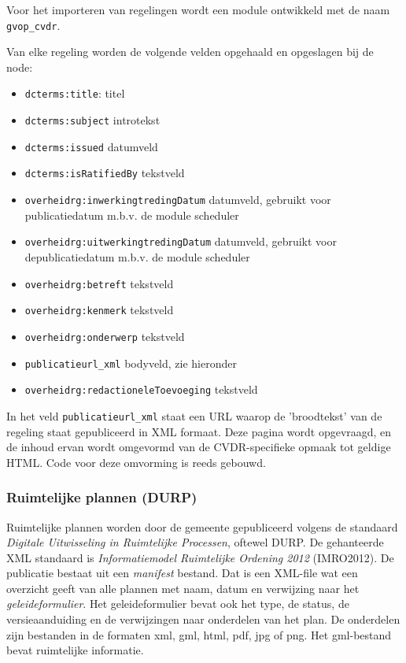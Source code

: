 Voor het importeren van regelingen wordt een module ontwikkeld met de naam \texttt{gvop\_cvdr}.

Van elke regeling worden de volgende velden opgehaald en opgeslagen bij de node:

\begin{itemize}
\item \texttt{dcterms:title}: titel
\item \texttt{dcterms:subject} introtekst
\item \texttt{dcterms:issued} datumveld
\item \texttt{dcterms:isRatifiedBy} tekstveld
\item \texttt{overheidrg:inwerkingtredingDatum} datumveld, gebruikt voor publicatiedatum m.b.v. de module scheduler
\item \texttt{overheidrg:uitwerkingtredingDatum} datumveld, gebruikt voor depublicatiedatum m.b.v. de module scheduler
\item \texttt{overheidrg:betreft} tekstveld
\item \texttt{overheidrg:kenmerk} tekstveld
\item \texttt{overheidrg:onderwerp} tekstveld
\item \texttt{publicatieurl\_xml} bodyveld, zie hieronder
\item \texttt{overheidrg:redactioneleToevoeging} tekstveld
\end{itemize}

In het veld \texttt{publicatieurl\_xml} staat een URL waarop de 'broodtekst' van de regeling staat gepubliceerd in XML formaat. Deze pagina wordt opgevraagd, en de inhoud ervan wordt omgevormd van de CVDR-specifieke opmaak tot geldige HTML. Code voor deze omvorming is reeds gebouwd.

\subsubsection{Ruimtelijke plannen (DURP)}

Ruimtelijke plannen worden door de gemeente gepubliceerd volgens de standaard \emph{Digitale Uitwisseling in Ruimtelijke Processen}, oftewel DURP. De gehanteerde XML standaard is \emph{Informatiemodel Ruimtelijke Ordening 2012} (IMRO2012). De publicatie bestaat uit een \emph{manifest} bestand. Dat is een XML-file wat een overzicht geeft van alle plannen met naam, datum en verwijzing naar het \emph{geleideformulier}. Het geleideformulier bevat ook het type, de status, de versieaanduiding en de verwijzingen naar onderdelen van het plan. De onderdelen zijn bestanden in de formaten xml, gml, html, pdf, jpg of png. Het gml-bestand bevat ruimtelijke informatie.

